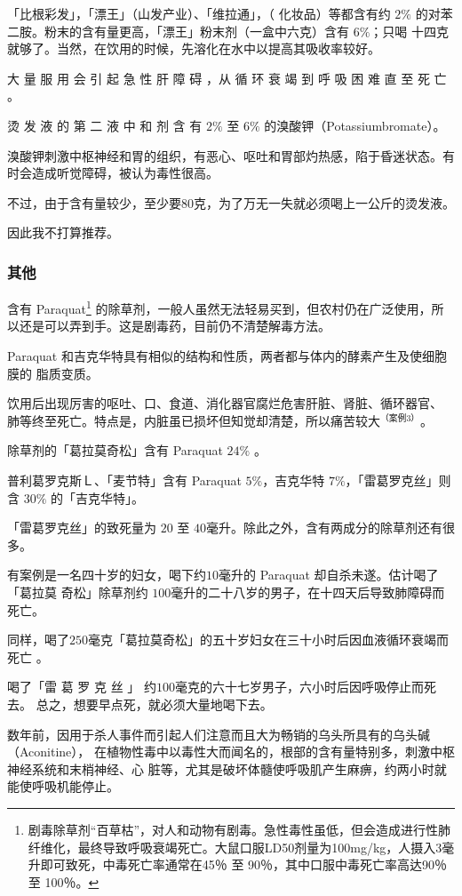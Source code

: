 \documentclass[UTF8]{ctexart}
\begin{document}
「比根彩发」，「漂王」（山发产业）、「维拉通」，（ 化妆品）等都含有约
$2\%$ 的对苯二胺。粉末的含有量更高，「漂王」粉末剂（一盒中六克）含有 $6\%$；只喝
十四克就够了。当然，在饮用的时候，先溶化在水中以提高其吸收率较好。

大 量 服 用 会 引 起 急 性 肝 障 碍 ，从 循 环 衰 竭 到 呼 吸 困 难 直 至 死 亡 。

烫 发 液 的 第 二 液 中 和 剂 含 有 $2\%$ 至 $6\%$ 的溴酸钾（Potassiumbromate）。

溴酸钾刺激中枢神经和胃的组织，有恶心、呕吐和胃部灼热感，陷于昏迷状态。有时会造成听觉障碍，被认为毒性很高。

不过，由于含有量较少，至少要$80$克，为了万无一失就必须喝上一公斤的烫发液。

因此我不打算推荐。

\subsubsection{其他}

含有 Paraquat\footnote{剧毒除草剂“百草枯”，对人和动物有剧毒。急性毒性虽低，但会造成进行性肺纤维化，最终导致呼吸衰竭死亡。大鼠口服LD50剂量为100mg/kg，人摄入3毫升即可致死，中毒死亡率通常在45％ 至 90％，其中口服中毒死亡率高达90％ 至 100％。} 的除草剂，一般人虽然无法轻易买到，但农村仍在广泛使用，所以还是可以弄到手。这是剧毒药，目前仍不清楚解毒方法。

Paraquat 和吉克华特具有相似的结构和性质，两者都与体内的酵素产生及使细胞膜的 脂质变质。

饮用后出现厉害的呕吐、口、食道、消化器官腐烂危害肝脏、肾脏、循环器官、 肺等终至死亡。特点是，内脏虽已损坏但知觉却清楚，所以痛苦较大$^{（案例 3）}$。

除草剂的「葛拉莫奇松」含有 Paraquat $24\%$ 。

普利葛罗克斯Ｌ、「麦节特」含有 Paraquat $5\%$，吉克华特 $7\%$，「雷葛罗克丝」则含 $30\%$ 的「吉克华特」。

「雷葛罗克丝」的致死量为 $20$ 至 $40$毫升。除此之外，含有两成分的除草剂还有很多。

有案例是一名四十岁的妇女，喝下约$10$毫升的 Paraquat 却自杀未遂。估计喝了「葛拉莫
奇松」除草剂约 $100$毫升的二十八岁的男子，在十四天后导致肺障碍而死亡。

同样，喝了$250$毫克「葛拉莫奇松」的五十岁妇女在三十小时后因血液循环衰竭而死亡 。

喝了「雷 葛 罗 克 丝 」 约$100$毫克的六十七岁男子，六小时后因呼吸停止而死去。
总之，想要早点死，就必须大量地喝下去。

数年前，因用于杀人事件而引起人们注意而且大为畅销的乌头所具有的乌头碱（Aconitine），
在植物性毒中以毒性大而闻名的，根部的含有量特别多，刺激中枢神经系统和末梢神经、心
脏等，尤其是破坏体髓使呼吸肌产生麻痹，约两小时就能使呼吸机能停止。
\end{document}
